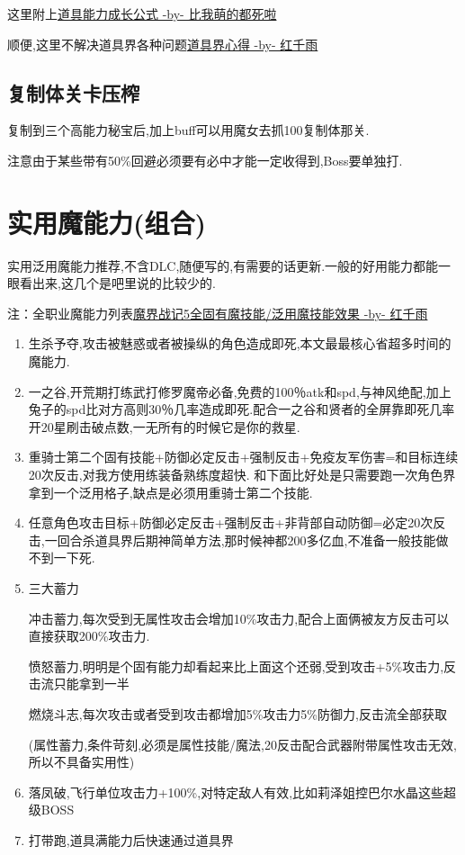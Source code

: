 		这里附上\href{http://tieba.baidu.com/f?kz=3834692385}{道具能力成长公式 -by- 比我萌的都死啦}

		顺便,这里不解决道具界各种问题\href{http://tieba.baidu.com/p/3730196003}{道具界心得 -by- 红千雨}


		\subsection{复制体关卡压榨}

		复制到三个高能力秘宝后,加上buff可以用魔女去抓100复制体那关.

		注意由于某些带有50\%回避必须要有必中才能一定收得到,Boss要单独打.
	
	\newpage

	\section{实用魔能力(组合)}

	实用泛用魔能力推荐,不含DLC,随便写的,有需要的话更新.一般的好用能力都能一眼看出来,这几个是吧里说的比较少的.

	注：全职业魔能力列表\href{http://tieba.baidu.com/p/3765501530}{魔界战记5全固有魔技能/泛用魔技能效果 -by- 红千雨}

	\begin{enumerate}
		\item
		生杀予夺,攻击被魅惑或者被操纵的角色造成即死,本文最最核心省超多时间的魔能力.
		\item
		一之谷,开荒期打练武打修罗魔帝必备,免费的100％atk和spd,与神风绝配,加上兔子的spd比对方高则30％几率造成即死.配合一之谷和贤者的全屏靠即死几率开20星刷击破点数,一无所有的时候它是你的救星.
		\item
		重骑士第二个固有技能+防御必定反击+强制反击+免疫友军伤害=和目标连续20次反击,对我方使用练装备熟练度超快.
		和下面比好处是只需要跑一次角色界拿到一个泛用格子,缺点是必须用重骑士第二个技能.
		\item
		任意角色攻击目标+防御必定反击+强制反击+非背部自动防御=必定20次反击,一回合杀道具界后期神简单方法,那时候神都200多亿血,不准备一般技能做不到一下死.
		\item
		三大蓄力

		冲击蓄力,每次受到无属性攻击会增加10\%攻击力,配合上面俩被友方反击可以直接获取200\%攻击力.

		愤怒蓄力,明明是个固有能力却看起来比上面这个还弱,受到攻击+5\%攻击力,反击流只能拿到一半

		燃烧斗志,每次攻击或者受到攻击都增加5\%攻击力5\%防御力,反击流全部获取

		(属性蓄力,条件苛刻,必须是属性技能/魔法,20反击配合武器附带属性攻击无效,所以不具备实用性)

		\item
		落凤破,飞行单位攻击力+100\%,对特定敌人有效,比如莉泽姐控巴尔水晶这些超级BOSS

		\item
		打带跑,道具满能力后快速通过道具界

	\end{enumerate}
	
